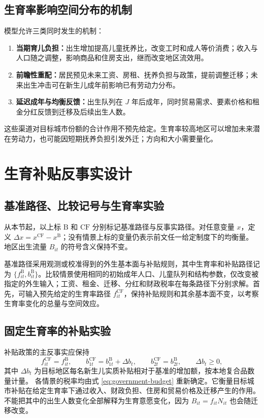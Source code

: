 \documentclass[UTF8,a4paper,zihao=-4,fontset=windows]{ctexart}
\numberwithin{equation}{section}
\newcommand{\B}{\mathrm B}
\newcommand{\CF}{\mathrm{CF}}
\begin{document}
\subsection{生育率影响空间分布的机制}
模型允许三类同时发生的机制：
\begin{enumerate}
  \item \textbf{当期育儿负担：}出生增加提高儿童抚养比，改变工时和成人等价消费；收入与人口随之调整，影响商品和住房支出，继而改变地区流效用。
  \item \textbf{前瞻性重配：}居民预见未来工资、房租、抚养负担与政策，提前调整迁移；未来出生冲击可在新生儿成年前影响已有劳动力分布。
  \item \textbf{延迟成年与均衡反馈：}出生队列在 $J$ 年后成年，同时贸易需求、要素价格和租金分红反馈到迁移及后续出生人数。
\end{enumerate}
这些渠道对目标城市份额的合计作用不预先给定。生育率较高地区可以增加未来潜在劳动力，也可能因短期抚养负担引发外迁；方向和大小需要量化。

\section{生育补贴反事实设计}
\label{sec:counterfactuals}

\subsection{基准路径、比较记号与生育率实验}
\label{sec:scenario-notation}
从本节起，以上标 $\B$ 和 $\CF$ 分别标记基准路径与反事实路径。对任意变量 $x$，定义 $\Delta x=x^{\CF}-x^{\B}$；没有情景上标的变量仍表示前文任一给定制度下的均衡量。地区出生流量 $B_{it}$ 的符号含义保持不变。

基准路径采用观测或校准得到的外生基本面与补贴规则，其中生育率和补贴路径记为 $\{f^\B_{it},b^\B_{it}\}$。比较情景使用相同的初始成年人口、儿童队列和结构参数，仅改变被指定的外生输入；工资、租金、迁移、分红和财政税率在每条路径下分别求解。首先，可输入预先给定的生育率路径 $f^{\CF}_{it}$，保持补贴规则和其余基本面不变，以考察生育率变化的总量与空间效应。

\subsection{固定生育率的补贴实验}
补贴政策的主反事实应保持
\begin{equation}
  f^{\CF}_{it}=f^\B_{it},\qquad
  b^{\CF}_{1t}=b^\B_{1t}+\Delta b_t,\qquad
  b^{\CF}_{2t}=b^\B_{2t},\qquad \Delta b_t\geq0,
  \label{eq:fixed-fertility-policy}
\end{equation}
其中 $\Delta b_t$ 为目标地区每名新生儿实质补贴相对于基准的增加额，按本地复合品数量计量。
各情景的税率均由式 \eqref{eq:government-budget} 重新确定。它衡量目标城市补贴在给定生育率下通过收入、财政负担、住房和贸易价格及迁移产生的作用。不能把其中的出生人数变化全部解释为生育意愿变化，因为 $B_{it}=f_{it}N_{it}$ 也会随迁移改变。
\end{document}
